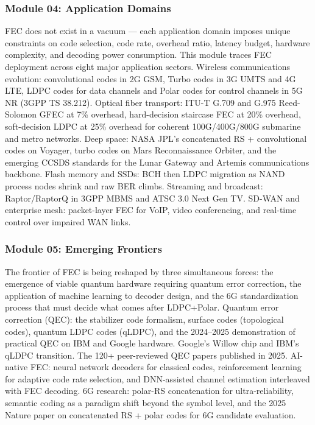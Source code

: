 \documentclass[11pt,letterpaper]{article}
\begin{document}
\subsubsection{Module 04: Application Domains}

FEC does not exist in a vacuum --- each application domain imposes unique constraints on code selection, code rate, overhead ratio, latency budget, hardware complexity, and decoding power consumption. This module traces FEC deployment across eight major application sectors. Wireless communications evolution: convolutional codes in 2G GSM, Turbo codes in 3G UMTS and 4G LTE, LDPC codes for data channels and Polar codes for control channels in 5G NR (3GPP TS 38.212). Optical fiber transport: ITU-T G.709 and G.975 Reed-Solomon GFEC at 7\% overhead, hard-decision staircase FEC at 20\% overhead, soft-decision LDPC at 25\% overhead for coherent 100G/400G/800G submarine and metro networks. Deep space: NASA JPL's concatenated RS + convolutional codes on Voyager, turbo codes on Mars Reconnaissance Orbiter, and the emerging CCSDS standards for the Lunar Gateway and Artemis communications backbone. Flash memory and SSDs: BCH then LDPC migration as NAND process nodes shrink and raw BER climbs. Streaming and broadcast: Raptor/RaptorQ in 3GPP MBMS and ATSC 3.0 Next Gen TV. SD-WAN and enterprise mesh: packet-layer FEC for VoIP, video conferencing, and real-time control over impaired WAN links.

\subsubsection{Module 05: Emerging Frontiers}

The frontier of FEC is being reshaped by three simultaneous forces: the emergence of viable quantum hardware requiring quantum error correction, the application of machine learning to decoder design, and the 6G standardization process that must decide what comes after LDPC+Polar. Quantum error correction (QEC): the stabilizer code formalism, surface codes (topological codes), quantum LDPC codes (qLDPC), and the 2024--2025 demonstration of practical QEC on IBM and Google hardware. Google's Willow chip and IBM's qLDPC transition. The 120+ peer-reviewed QEC papers published in 2025. AI-native FEC: neural network decoders for classical codes, reinforcement learning for adaptive code rate selection, and DNN-assisted channel estimation interleaved with FEC decoding. 6G research: polar-RS concatenation for ultra-reliability, semantic coding as a paradigm shift beyond the symbol level, and the 2025 Nature paper on concatenated RS + polar codes for 6G candidate evaluation.
\end{document}
